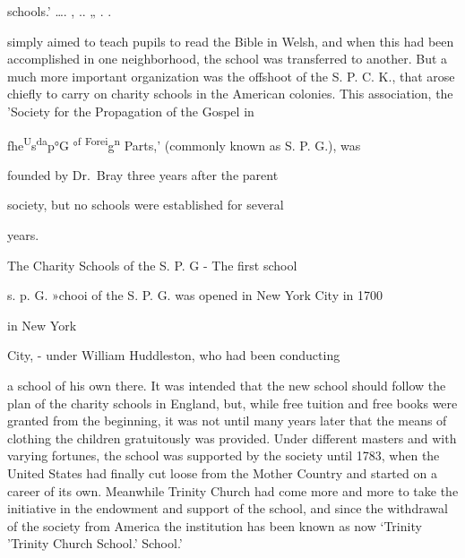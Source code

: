 \documentclass[]{book}
\begin{document}
schools.' \ldots{}. , .. „ . .

simply aimed to teach pupils to read the Bible in Welsh, and when this had been accomplished in one neighborhood, the school was transferred to another. But a much more important organization was the offshoot of the S. P. C. K., that arose chiefly to carry on charity schools in the American colonies. This association, the 'Society for the Propagation of the Gospel in

fhe\textsuperscript{U}s\textsuperscript{da}p°G °\textsuperscript{f} \textsuperscript{Forei}g\textsuperscript{n} Parts,' (commonly known as S. P. G.), was

founded by Dr.~Bray three years after the parent

society, but no schools were established for several

years.

The Charity Schools of the S. P. G - The first school

s. p. \textsc{G. }»chooi of the S. P. G. was opened in New York City in 1700

in New York

City, - under William Huddleston, who had been conducting

a school of his own there. It was intended that the new school should follow the plan of the charity schools in England, but, while free tuition and free books were granted from the beginning, it was not until many years later that the means of clothing the children gratuitously was provided. Under different masters and with varying fortunes, the school was supported by the society until 1783, when the United States had finally cut loose from the Mother Country and started on a career of its own. Meanwhile Trinity Church had come more and more to take the initiative in the endowment and support of the school, and since the withdrawal of the\protect\hypertarget{ch20.xmlux5cux23para.294.1.0.box.132.220.1232.98.q.60}{}{ society from America the institution has been known as now `Trinity 'Trinity Church School.' School.'}
\end{document}
